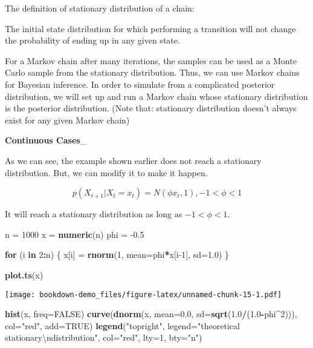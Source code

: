 \documentclass[
]{book}
\newenvironment{Shaded}{\begin{snugshade}}{\end{snugshade}}
\newcommand{\CharTok}[1]{\textcolor[rgb]{0.31,0.60,0.02}{#1}}
\newcommand{\ControlFlowTok}[1]{\textcolor[rgb]{0.13,0.29,0.53}{\textbf{#1}}}
\newcommand{\DataTypeTok}[1]{\textcolor[rgb]{0.13,0.29,0.53}{#1}}
\newcommand{\DecValTok}[1]{\textcolor[rgb]{0.00,0.00,0.81}{#1}}
\newcommand{\FloatTok}[1]{\textcolor[rgb]{0.00,0.00,0.81}{#1}}
\newcommand{\KeywordTok}[1]{\textcolor[rgb]{0.13,0.29,0.53}{\textbf{#1}}}
\newcommand{\NormalTok}[1]{#1}
\newcommand{\OperatorTok}[1]{\textcolor[rgb]{0.81,0.36,0.00}{\textbf{#1}}}
\newcommand{\OtherTok}[1]{\textcolor[rgb]{0.56,0.35,0.01}{#1}}
\newcommand{\StringTok}[1]{\textcolor[rgb]{0.31,0.60,0.02}{#1}}
\begin{document}
The definition of stationary distribution of a chain:

The initial state distribution for which performing a transition will not change the probability of ending up in any given state.

For a Markov chain after many iterations, the samples can be used as a Monte Carlo sample from the stationary distribution. Thus, we can use Markov chains for Bayesian inference. In order to simulate from a complicated posterior distribution, we will set up and run a Markov chain whose stationary distribution is the posterior distribution. (Note that: stationary distribution doesn't always exist for any given Markov chain)

\textbf{Continuous Cases}\_

As we can see, the example shown earlier does not reach a stationary distribution. But, we can modify it to make it happen.

\[p(X_{t+1}|X_t=x_t)=N(\phi x_t,1), -1<\phi<1\]

It will reach a stationary distribution as long as \(-1<\phi<1\).

\begin{Shaded}
\begin{Highlighting}[]
\NormalTok{n =}\StringTok{ }\DecValTok{1000}
\NormalTok{x =}\StringTok{ }\KeywordTok{numeric}\NormalTok{(n)}
\NormalTok{phi =}\StringTok{ }\FloatTok{-0.5}

\ControlFlowTok{for}\NormalTok{ (i }\ControlFlowTok{in} \DecValTok{2}\OperatorTok{:}\NormalTok{n) \{}
\NormalTok{  x[i] =}\StringTok{ }\KeywordTok{rnorm}\NormalTok{(}\DecValTok{1}\NormalTok{, }\DataTypeTok{mean=}\NormalTok{phi}\OperatorTok{*}\NormalTok{x[i}\DecValTok{-1}\NormalTok{], }\DataTypeTok{sd=}\FloatTok{1.0}\NormalTok{)}
\NormalTok{\}}

\KeywordTok{plot.ts}\NormalTok{(x)}
\end{Highlighting}
\end{Shaded}

\texttt{[image: bookdown-demo\_files/figure-latex/unnamed-chunk-15-1.pdf]}

\begin{Shaded}
\begin{Highlighting}[]
\KeywordTok{hist}\NormalTok{(x, }\DataTypeTok{freq=}\OtherTok{FALSE}\NormalTok{)}
\KeywordTok{curve}\NormalTok{(}\KeywordTok{dnorm}\NormalTok{(x, }\DataTypeTok{mean=}\FloatTok{0.0}\NormalTok{, }\DataTypeTok{sd=}\KeywordTok{sqrt}\NormalTok{(}\FloatTok{1.0}\OperatorTok{/}\NormalTok{(}\FloatTok{1.0}\OperatorTok{-}\NormalTok{phi}\OperatorTok{^}\DecValTok{2}\NormalTok{))), }\DataTypeTok{col=}\StringTok{"red"}\NormalTok{, }\DataTypeTok{add=}\OtherTok{TRUE}\NormalTok{)}
\KeywordTok{legend}\NormalTok{(}\StringTok{"topright"}\NormalTok{, }\DataTypeTok{legend=}\StringTok{"theoretical stationary}\CharTok{\textbackslash{}n}\StringTok{distribution"}\NormalTok{, }\DataTypeTok{col=}\StringTok{"red"}\NormalTok{, }\DataTypeTok{lty=}\DecValTok{1}\NormalTok{, }\DataTypeTok{bty=}\StringTok{"n"}\NormalTok{)}
\end{Highlighting}
\end{Shaded}
\end{document}

